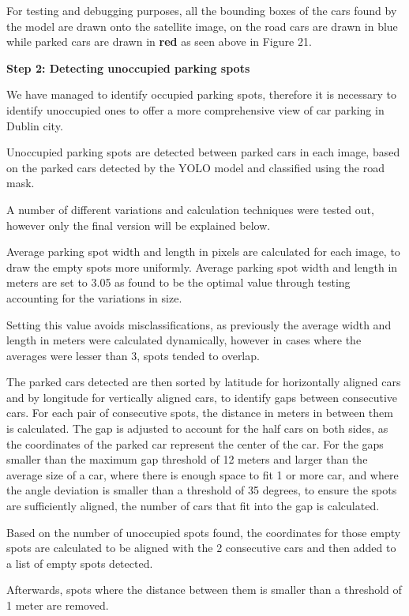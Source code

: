 For testing and debugging purposes, all the bounding boxes of the cars found by
the model are drawn onto the satellite image, on the road cars are drawn in blue
while parked cars are drawn in \textbf{red} as seen above in
Figure 21.

\newpage{}

\textbf{Step 2: Detecting unoccupied parking spots}

We have managed to identify occupied parking spots, therefore it is necessary to
identify unoccupied ones to offer a more comprehensive view of car parking in
Dublin city.

Unoccupied parking spots are detected between parked cars in each image, based on the
parked cars detected by the YOLO model and classified using the road mask.

A number of different variations and calculation techniques were tested out,
however only the final version will be explained below.

Average parking spot width and length in pixels are calculated for each image,
to draw the empty spots more uniformly. Average parking spot width and length in
meters are set to 3.05 as found to be the optimal value through testing
accounting for the variations in size.

Setting this value avoids misclassifications, as previously the average width and
length in meters were calculated dynamically, however in cases where the
averages were lesser than 3, spots tended to overlap.

The parked cars detected are then sorted by latitude for horizontally aligned
cars and by longitude for vertically aligned cars, to identify gaps between
consecutive cars. For each pair of consecutive spots, the distance in meters in
between them is calculated. The gap is adjusted to account for the half cars on
both sides, as the coordinates of the parked car represent the center of the
car. For the gaps smaller than the maximum gap threshold of 12 meters and larger
than the average size of a car, where there is enough space to fit 1 or more
car, and where the angle deviation is smaller than a threshold of 35 degrees, to
ensure the spots are sufficiently aligned, the number of cars that fit into the
gap is calculated.

Based on the number of unoccupied spots found, the coordinates for those empty spots
are calculated to be aligned with the 2 consecutive cars and then added to a
list of empty spots detected.

Afterwards, spots where the distance between them is smaller than a threshold of
1 meter are removed.

